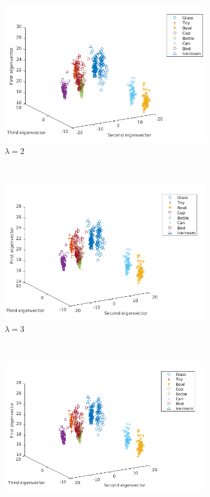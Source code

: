 \documentclass[10pt,a4paper]{article}
\theoremstyle{plain}
\theoremstyle{definition}
\begin{document}
\begin{figure}[H]
	\centering
	\begin{subfigure}[b]{0.5\textwidth}
		\includegraphics[width= \textwidth]{images/Laplace-lam2.png}
		\caption{$\lambda=2$}
		\label{}
	\end{subfigure}~
	\begin{subfigure}[b]{0.5\textwidth}
		\includegraphics[width= \textwidth]{images/Laplace-lam3.png}
		\caption{$\lambda=3$}
		\label{}
	\end{subfigure}\\
	\begin{subfigure}[b]{0.5\textwidth}
		\includegraphics[width= \textwidth]{images/Laplace-lam4.png}

\end{subfigure}
\end{figure}
\end{document}
